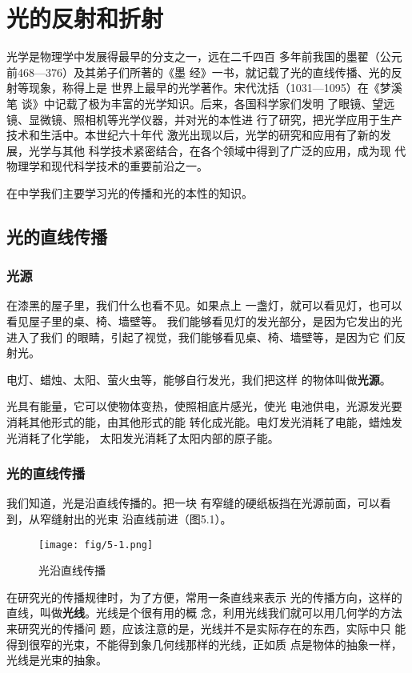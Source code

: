 
\chapter{光的反射和折射}

光学是物理学中发展得最早的分支之一，远在二千四百
多年前我国的墨翟（公元前468—376）及其弟子们所著的《墨
经》一书，就记载了光的直线传播、光的反射等现象，称得上是
世界上最早的光学著作。宋代沈括（1031—1095）在《梦溪笔
谈》中记载了极为丰富的光学知识。后来，各国科学家们发明
了眼镜、望远镜、显微镜、照相机等光学仪器，并对光的本性进
行了研究，把光学应用于生产技术和生活中。本世纪六十年代
激光出现以后，光学的研究和应用有了新的发展，光学与其他
科学技术紧密结合，在各个领域中得到了广泛的应用，成为现
代物理学和现代科学技术的重要前沿之一。

在中学我们主要学习光的传播和光的本性的知识。

\section{光的直线传播}
\subsection{光源}

在漆黑的屋子里，我们什么也看不见。如果点上
一盏灯，就可以看见灯，也可以看见屋子里的桌、椅、墙壁等。
我们能够看见灯的发光部分，是因为它发出的光进入了我们
的眼睛，引起了视觉，我们能够看见桌、椅、墙壁等，是因为它
们反射光。

电灯、蜡烛、太阳、萤火虫等，能够自行发光，我们把这样
的物体叫做\textbf{光源}。

光具有能量，它可以使物体变热，使照相底片感光，使光
电池供电，光源发光要消耗其他形式的能，由其他形式的能
转化成光能。电灯发光消耗了电能，蜡烛发光消耗了化学能，
太阳发光消耗了太阳内部的原子能。

\subsection{光的直线传播}

我们知道，光是沿直线传播的。把一块
有窄缝的硬纸板挡在光源前面，可以看到，从窄缝射出的光束
沿直线前进（图5.1）。
\begin{figure}[htp]\centering
    \texttt{[image: fig/5-1.png]}
    \caption{光沿直线传播}
    \end{figure}

在研究光的传播规律时，为了方便，常用一条直线来表示
光的传播方向，这样的直线，叫做\textbf{光线}。光线是个很有用的概
念，利用光线我们就可以用几何学的方法来研究光的传播问
题，应该注意的是，光线并不是实际存在的东西，实际中只
能得到很窄的光束，不能得到象几何线那样的光线，正如质
点是物体的抽象一样，光线是光束的抽象。


